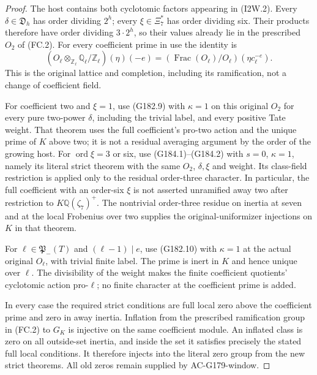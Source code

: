 \begin{proof}
The host contains both cyclotomic factors appearing in (I2W.2).
Every $\delta\in\mathfrak D_h$ has order dividing $2^h$;
every $\xi\in\Xi_7^*$ has order dividing six.
Their products therefore have order dividing $3\cdot2^h$, so
their values already lie in the prescribed $O_2$ of (FC.2).
For every coefficient prime in use the identity is
\[
 (O_\ell\otimes_{\mathbb Z_\ell}\mathbb Q_\ell/\mathbb Z_\ell)
               (\eta)(-e)
       =(\operatorname{Frac}(O_\ell)/O_\ell)(\eta c_\ell^{-e}).
 \tag{I2W.8}
\]
This is the original lattice and completion, including its
ramification, not a change of coefficient field.

For coefficient two and $\xi=1$, use (G182.9) with $\kappa=1$
on this original $O_2$ for every pure two-power $\delta$, including
the trivial label, and every positive Tate weight.
That theorem uses the full coefficient's pro-two action and the
unique prime of $K$ above two; it is not a residual averaging
argument by the order of the growing host.
For $\operatorname{ord}\xi=3$ or six, use (G184.1)--(G184.2)
with $s=0$, $\kappa=1$, namely its literal strict theorem with the same $O_2$, $\delta,\xi$ and weight.
Its class-field restriction is applied only to the residual
order-three character.  In particular, the full coefficient with
an order-six $\xi$ is not asserted unramified away two after
restriction to $K\mathbb Q(\zeta_7)^+$.
The nontrivial order-three residue on inertia at seven and at
the local Frobenius over two supplies the original-uniformizer
injections on $K$ in that theorem.

For $\ell\in\mathfrak P_-(T)$ and $(\ell-1)\mid e$, use
(G182.10) with $\kappa=1$ at the actual original
$O_\ell$, with trivial finite label.
The prime is inert in $K$ and hence unique over $\ell$.
The divisibility of the weight makes the finite coefficient
quotients' cyclotomic action pro-$\ell$; no finite character at
the coefficient prime is added.

In every case the required strict conditions are full local zero
above the coefficient prime and zero in away inertia.
Inflation from the prescribed ramification group in (FC.2) to
$G_K$ is injective on the same coefficient module.
An inflated class is zero on all outside-set inertia, and inside
the set it satisfies precisely the stated full local conditions.
It therefore injects into the literal zero group from the new
strict theorems.  All old zeros remain supplied by AC-G179-window.


\end{proof}
